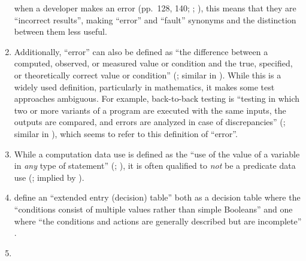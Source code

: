 \begin{enumerate}
          when a developer makes an error %
          (pp.~128, 140; \citealp[p.~12\=/3]{SWEBOK2024};
          \citealp[pp.~399\==400]{vanVliet2000}), this means that they are
          ``incorrect results'', making ``error'' and ``fault'' synonyms%
           and
          the distinction between them less useful.
    \item %
          Additionally, ``error'' can also be defined as ``the
          difference between a computed, observed, or measured value or
          condition and the true, specified, or theoretically correct value
          or condition'' (\citealp[p.~128]{IEEE2010}; similar in
          \citealp[pp.~17\=/18 to 17\=/19, 18\=/7 to 18\=/8]{SWEBOK2024}).
          While this is a widely used definition, particularly in mathematics,
          it makes some test approaches ambiguous.
          For example, back-to-back
          testing is ``testing in which two or more variants of a program are
          executed with the same inputs, the outputs are compared, and errors
          are analyzed in case of discrepancies'' (\citealp[p.~30]{IEEE2010};
          similar in \citealpISTQB{}), which seems to refer to this definition
          of ``error''.
    \item %
          While a computation data use is defined as the ``use of the value of a
          variable in \emph{any} type of statement'' (\citealp[p.~2]{IEEE2021b};
          \citeyear[p.~83, emphasis added]{IEEE2017}), it is
          often qualified to \emph{not} be a predicate data use
          (\citealp[p.~424]{vanVliet2000}; implied by \citealp[p.~27]{IEEE2021b}).
    \item %
          \citeauthor{IEEE2021b} define an ``extended entry (decision) table''
          both as a decision table where the ``conditions consist of multiple
          values rather than simple Booleans'' \citeyearpar[p.~18]{IEEE2021b}
          and one where ``the conditions and actions are generally described
          but are incomplete'' \citeyearpar[p.~175]{IEEE2017}.
    \item %

\end{enumerate}
